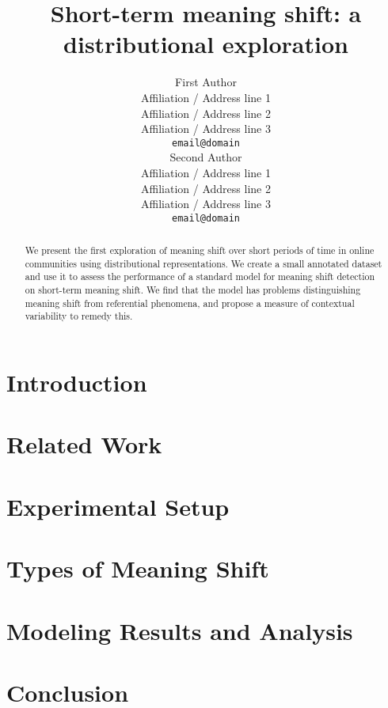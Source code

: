 \documentclass[11pt,a4paper]{article}
\title{Short-term meaning shift: a distributional exploration}
\author{First Author \\
  Affiliation / Address line 1 \\
  Affiliation / Address line 2 \\
  Affiliation / Address line 3 \\
  {\tt email@domain} \\\And
  Second Author \\
  Affiliation / Address line 1 \\
  Affiliation / Address line 2 \\
  Affiliation / Address line 3 \\
  {\tt email@domain} \\}
\date{}
\begin{document}
\maketitle
\begin{abstract}
We present the first exploration of meaning shift over short periods of time in online communities using distributional representations. We create a small annotated dataset and use it to assess the performance of a standard model for meaning shift detection on short-term meaning shift. We find that the model has problems distinguishing meaning shift from referential phenomena, and propose a measure of contextual variability to remedy this.


\end{abstract}

\section{Introduction}
\label{sect:Introduction}


 
\section{Related Work}
\label{sect:Related_Work}



\section{Experimental Setup}
\label{sec:setup}



\section{Types of Meaning Shift}
\label{sec:types}



\section{Modeling Results and Analysis}
\label{sect:results}



\section{Conclusion}
\label{sect:conc}






\end{document}
